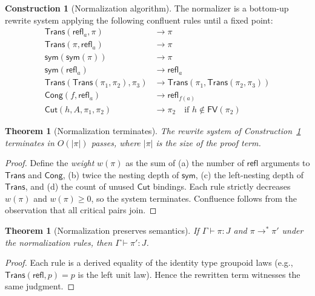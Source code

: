 \documentclass[11pt,a4paper]{report}
\theoremstyle{definition}
\newtheorem{construction}[definition]{Construction}
\theoremstyle{plain}
\newtheorem{theorem}[definition]{Theorem}
\newcommand{\Refl}{\mathsf{refl}}
\newcommand{\sym}{\mathsf{sym}}
\newcommand{\Cut}{\mathsf{Cut}}
\newcommand{\Trans}{\mathsf{Trans}}
\newcommand{\Cong}{\mathsf{Cong}}
\begin{document}
\begin{construction}[Normalization algorithm]
\label{con:normalization}
The normalizer is a bottom-up rewrite system applying the following
confluent rules until a fixed point:
\begin{align}
  \Trans(\Refl_a, \pi) &\longrightarrow \pi
    \label{eq:norm-refl-left} \\
  \Trans(\pi, \Refl_a) &\longrightarrow \pi
    \label{eq:norm-refl-right} \\
  \sym(\sym(\pi)) &\longrightarrow \pi
    \label{eq:norm-sym-sym} \\
  \sym(\Refl_a) &\longrightarrow \Refl_a
    \label{eq:norm-sym-refl} \\
  \Trans(\Trans(\pi_1, \pi_2), \pi_3)
    &\longrightarrow \Trans(\pi_1, \Trans(\pi_2, \pi_3))
    \label{eq:norm-assoc} \\
  \Cong(f, \Refl_a) &\longrightarrow \Refl_{f(a)}
    \label{eq:norm-cong-refl} \\
  \Cut(h, A, \pi_1, \pi_2) &\longrightarrow \pi_2
    \quad \text{if } h \notin \mathsf{FV}(\pi_2)
    \label{eq:norm-dead-cut}
\end{align}
\end{construction}

\begin{theorem}[Normalization terminates]
The rewrite system of Construction~\ref{con:normalization} terminates in
$O(|\pi|)$ passes, where $|\pi|$ is the size of the proof term.
\end{theorem}
\begin{proof}
Define the \emph{weight} $w(\pi)$ as the sum of (a) the number of
$\Refl$ arguments to $\Trans$ and $\Cong$, (b) twice the nesting depth
of $\sym$, (c) the left-nesting depth of $\Trans$, and (d) the count
of unused $\Cut$ bindings. Each rule strictly decreases $w(\pi)$
and $w(\pi) \geq 0$, so the system terminates. Confluence follows from
the observation that all critical pairs join.
\end{proof}

\begin{theorem}[Normalization preserves semantics]
If $\Gamma \vdash \pi : J$ and $\pi \longrightarrow^{*} \pi'$ under the
normalization rules, then $\Gamma \vdash \pi' : J$.
\end{theorem}
\begin{proof}
Each rule is a derived equality of the identity type groupoid laws (e.g.,
$\Trans(\Refl, p) = p$ is the left unit law). Hence the rewritten term
witnesses the same judgment.
\end{proof}
\end{document}
